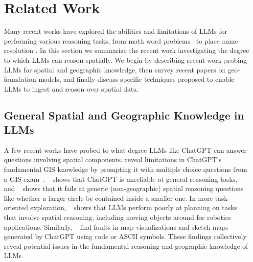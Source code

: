 \section{Related Work}
\label{section:related}
\normalsize

Many recent works have explored the abilities and limitations of LLMs for performing various reasoning tasks, from math word problems~\cite{Gao2023, Badaro2023} to place name resolution \cite{Mai2023}.
In this section we summarize the recent work investigating the degree to which LLMs can reason spatially.
We begin by describing recent work probing LLMs for spatial and geographic knowledge, then survey recent papers on geo-foundation models, and finally discuss specific techniques proposed to enable LLMs to ingest and reason over spatial data.


\subsection{General Spatial and Geographic Knowledge in LLMs}
A few recent works have probed to what degree LLMs like ChatGPT can answer questions involving spatial components.
%
\citeauthor{Mooney2023} reveal limitations in ChatGPT's fundamental GIS knowledge by prompting it with multiple choice questions from a GIS exam~\cite{Mooney2023}.
\citeauthor{Bang2023}~\cite{Bang2023} shows that ChatGPT is unreliable at general reasoning tasks, and
\citeauthor{Cohn2023}~\cite{Cohn2023} shows that it fails at generic (non-geographic) spatial reasoning questions like whether a larger circle be contained inside a smaller one.
In more task-oriented exploration, 
\citeauthor{Xie2023translating}~\cite{Xie2023translating} shows that LLMs perform poorly at planning on tasks that involve spatial reasoning, including moving objects around for robotics applications.
Similarly, 
\citeauthor{Tao2023}~\cite{Tao2023} find faults in map visualizations and sketch maps generated by ChatGPT using code or ASCII symbols.
%
These findings collectively reveal potential issues in the fundamental reasoning and geographic knowledge of LLMs.





